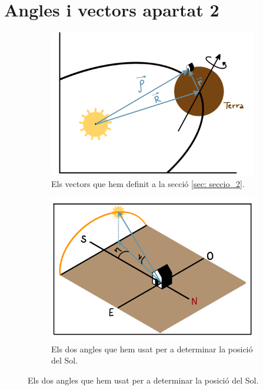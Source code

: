 \documentclass[11pt]{article}
\begin{document}
\section{Angles i vectors apartat 2}
\begin{figure}[hbt]
    \centering
    \begin{subfigure}{0.5\textwidth}
        \centering
        \includegraphics[width=\textwidth]{vectors.PNG}
        \caption{Els vectors que hem definit a la secció \ref{sec: seccio_2}.}
        \label{fig: sist_vectors}
    \end{subfigure}%
    \hspace{0.000001\textwidth}%
    \begin{subfigure}{0.5\textwidth}
        \centering
        \includegraphics[width=\textwidth]{ang_sol.PNG}
        \caption{Els dos angles que hem usat per a determinar la posició del Sol.}
        \label{fig: sist_sol}
    \end{subfigure}
\end{figure}
\end{document}

